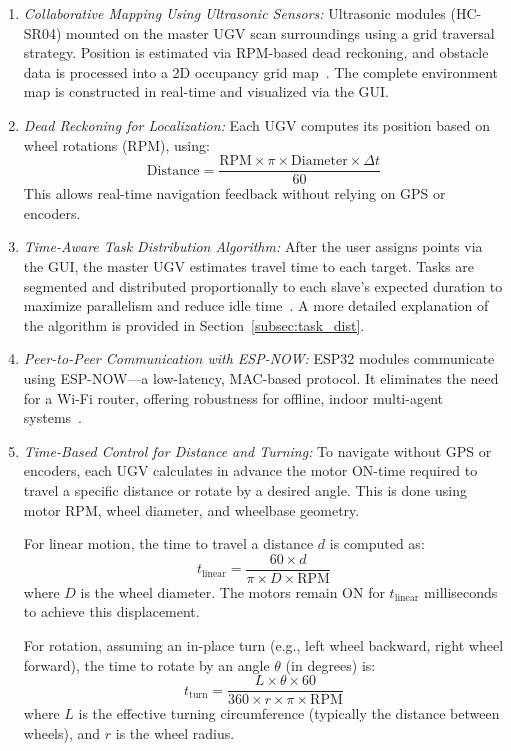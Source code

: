 \documentclass[conference]{IEEEtran}
\begin{document}
\begin{enumerate}
\item {\em Collaborative Mapping Using Ultrasonic Sensors:}
Ultrasonic modules (HC-SR04) mounted on the master UGV scan surroundings using a grid traversal strategy. Position is estimated via RPM-based dead reckoning, and obstacle data is processed into a 2D occupancy grid map~\cite{arduino_hcsr04}. The complete environment map is constructed in real-time and visualized via the GUI.

\item {\em Dead Reckoning for Localization:}
Each UGV computes its position based on wheel rotations (RPM), using:
\begin{equation}
\text{Distance} = \frac{\text{RPM} \times \pi \times \text{Diameter} \times \Delta t}{60}
\end{equation}
This allows real-time navigation feedback without relying on GPS or encoders.

\item {\em Time-Aware Task Distribution Algorithm: }
After the user assigns points via the GUI, the master UGV estimates travel time to each target. Tasks are segmented and distributed proportionally to each slave’s expected duration to maximize parallelism and reduce idle time~\cite{jin2024multi}. A more detailed explanation of the algorithm is provided in Section~\ref{subsec:task_dist}.

\item {\em Peer-to-Peer Communication with ESP-NOW: }
ESP32 modules communicate using ESP-NOW—a low-latency, MAC-based protocol. It eliminates the need for a Wi-Fi router, offering robustness for offline, indoor multi-agent systems~\cite{espnowguide}.


\item {\em Time-Based Control for Distance and Turning: }
To navigate without GPS or encoders, each UGV calculates in advance the motor ON-time required to travel a specific distance or rotate by a desired angle. This is done using motor RPM, wheel diameter, and wheelbase geometry.

For linear motion, the time to travel a distance $d$ is computed as:
\begin{equation}
t_{\text{linear}} = \frac{60 \times d}{\pi \times D \times \text{RPM}}
\end{equation}
where $D$ is the wheel diameter. The motors remain ON for $t_{\text{linear}}$ milliseconds to achieve this displacement.

For rotation, assuming an in-place turn (e.g., left wheel backward, right wheel forward), the time to rotate by an angle $\theta$ (in degrees) is:
\begin{equation}
t_{\text{turn}} = \frac{L \times \theta \times 60}{360 \times r \times \pi \times \text{RPM}}
\end{equation}
where $L$ is the effective turning circumference (typically the distance between wheels), and $r$ is the wheel radius.


\end{enumerate}
\end{document}
